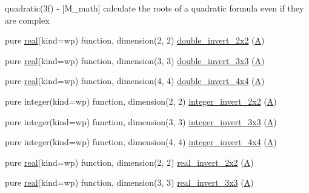 \begin{DoxyCompactItemize}
\begin{DoxyCompactList}
quadratic(3f) -\/ \mbox{[}M\+\_\+math\mbox{]} calculate the roots of a quadratic formula even if they are complex \end{DoxyCompactList}\item 
pure \hyperlink{read__watch_83_8txt_abdb62bde002f38ef75f810d3a905a823}{real}(kind=wp) function, dimension(2, 2) \hyperlink{namespacem__math_ae65562df2e78e7ebc0660a8f8b3a4030}{double\+\_\+invert\+\_\+2x2} (\hyperlink{ufpp__overview_81_8txt_a8341271e5f4e3003f6eb1c9547fc9d1a}{A})
\item 
pure \hyperlink{read__watch_83_8txt_abdb62bde002f38ef75f810d3a905a823}{real}(kind=wp) function, dimension(3, 3) \hyperlink{namespacem__math_a7ff8d2485bffbbe9fce3e13d62a19677}{double\+\_\+invert\+\_\+3x3} (\hyperlink{ufpp__overview_81_8txt_a8341271e5f4e3003f6eb1c9547fc9d1a}{A})
\item 
pure \hyperlink{read__watch_83_8txt_abdb62bde002f38ef75f810d3a905a823}{real}(kind=wp) function, dimension(4, 4) \hyperlink{namespacem__math_a258a8a014e105b40c2653d3036e7ddb6}{double\+\_\+invert\+\_\+4x4} (\hyperlink{ufpp__overview_81_8txt_a8341271e5f4e3003f6eb1c9547fc9d1a}{A})
\item 
pure integer(kind=wp) function, dimension(2, 2) \hyperlink{namespacem__math_abccb5c1bfc17724aca07448be7b1d2c8}{integer\+\_\+invert\+\_\+2x2} (\hyperlink{ufpp__overview_81_8txt_a8341271e5f4e3003f6eb1c9547fc9d1a}{A})
\item 
pure integer(kind=wp) function, dimension(3, 3) \hyperlink{namespacem__math_aa8aaf1df6257440a637e51922f2d482f}{integer\+\_\+invert\+\_\+3x3} (\hyperlink{ufpp__overview_81_8txt_a8341271e5f4e3003f6eb1c9547fc9d1a}{A})
\item 
pure integer(kind=wp) function, dimension(4, 4) \hyperlink{namespacem__math_a4bd503fea27968c6b3d7ab2a71509db7}{integer\+\_\+invert\+\_\+4x4} (\hyperlink{ufpp__overview_81_8txt_a8341271e5f4e3003f6eb1c9547fc9d1a}{A})
\item 
pure \hyperlink{read__watch_83_8txt_abdb62bde002f38ef75f810d3a905a823}{real}(kind=wp) function, dimension(2, 2) \hyperlink{namespacem__math_aa8b68ce8fb1a10c992e769f2e042979e}{real\+\_\+invert\+\_\+2x2} (\hyperlink{ufpp__overview_81_8txt_a8341271e5f4e3003f6eb1c9547fc9d1a}{A})
\item 
pure \hyperlink{read__watch_83_8txt_abdb62bde002f38ef75f810d3a905a823}{real}(kind=wp) function, dimension(3, 3) \hyperlink{namespacem__math_a79f32ff4d35916ca4422bb8ce0d30113}{real\+\_\+invert\+\_\+3x3} (\hyperlink{ufpp__overview_81_8txt_a8341271e5f4e3003f6eb1c9547fc9d1a}{A})
\item 

\end{DoxyCompactItemize}
